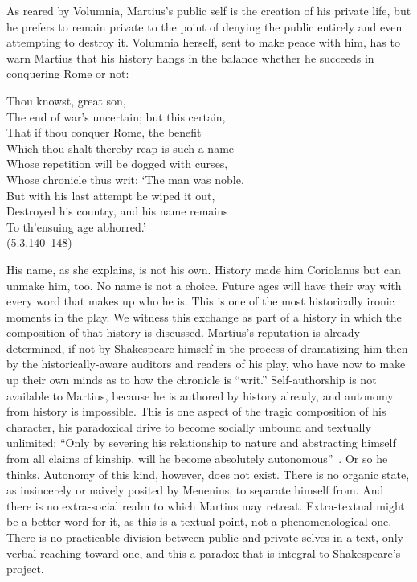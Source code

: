 As reared by Volumnia, Martius's public self is the creation of his private life, but he prefers to remain private to the point of denying the public entirely and even attempting to destroy it.
Volumnia herself, sent to make peace with him, has to warn Martius that his history hangs in the balance whether he succeeds in conquering Rome or not:
\begin{vq}
Thou knowst, great son,\\
The end of war's uncertain; but this certain,\\
That if thou conquer Rome, the benefit\\
Which thou shalt thereby reap is such a name\\
Whose repetition will be dogged with curses,\\
Whose chronicle thus writ: `The man was noble,\\
But with his last attempt he wiped it out,\\
Destroyed his country, and his name remains\\
To th'ensuing age abhorred.'\\
\hfill(5.3.140--148)
\end{vq}
His name, as she explains, is not his own.
History made him Coriolanus but can unmake him, too.
No name is not a choice.
Future ages will have their way with every word that makes up who he is.
This is one of the most historically ironic moments in the play.
We witness this exchange as part of a history in which the composition of that history is discussed.
Martius's reputation is already determined, if not by Shakespeare himself in the process of dramatizing him then by the historically-aware auditors and readers of his play, who have now to make up their own minds as to how the chronicle is ``writ.''
Self-authorship is not available to Martius, because he is authored by history already, and autonomy from history is impossible.
This is one aspect of the tragic composition of his character, his paradoxical drive to become socially unbound and textually unlimited:
``Only by severing his relationship to nature and abstracting himself from all claims of kinship, will he become absolutely autonomous''~\cite[110]{greenblatt_shakespeares_2010}.
Or so he thinks.
Autonomy of this kind, however, does not exist.
There is no organic state, as insincerely or naively posited by Menenius, to separate himself from.
And there is no extra-social realm to which Martius may retreat.
Extra-textual might be a better word for it, as this is a textual point, not a phenomenological one.
There is no practicable division between public and private selves in a text, only verbal reaching toward one, and this a paradox that is integral to Shakespeare's project.
